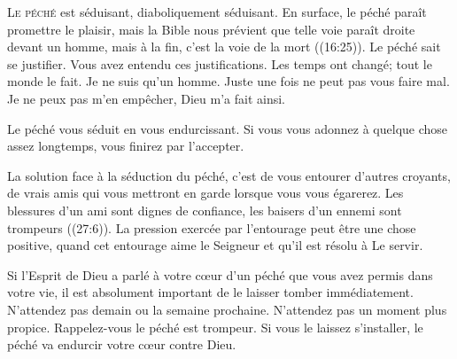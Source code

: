 \dvrule






\lettrine{L}{e péché} est séduisant, diaboliquement séduisant.
 En surface, le péché paraît promettre le plaisir,
 mais la Bible nous prévient que \Og telle 
 voie paraît droite devant un homme, mais à la fin,
 c'est la voie de la mort \Fg{} ((16:25)).
 Le péché sait se justifier. Vous avez entendu ces justifications.
 \Og Les temps ont changé; tout le monde le fait. \Fg{}
 \Og Je ne suis qu'un homme. \Fg{}
 \Og Juste une fois ne peut pas vous faire mal. \Fg{}
 \Og Je ne peux pas m'en empêcher, Dieu m'a fait ainsi. \Fg{}


Le péché vous séduit en vous endurcissant.
 Si vous vous adonnez à quelque chose assez longtemps,
 vous finirez par l'accepter. 

La solution face à la séduction du péché, c'est de vous entourer
 d'autres croyants, de vrais amis qui vous mettront en garde
 lorsque vous vous égarerez.
 \Og Les blessures d'un ami sont dignes de confiance,
 les baisers d'un ennemi sont trompeurs \Fg{} ((27:6)).
 La pression exercée par l'entourage peut être une chose positive,
 quand cet entourage aime le Seigneur et qu'il est résolu à Le servir. 

Si l'Esprit de Dieu a parlé à votre c\oe{}ur d'un péché que vous avez permis
 dans votre vie, il est absolument important de le laisser tomber
 immédiatement.
 N'attendez pas demain ou la semaine prochaine.
 N'attendez pas un moment plus propice. Rappelez-vous\frcolon
 le péché est trompeur.
 Si vous le laissez s'installer,
 le péché va endurcir votre c\oe{}ur contre Dieu. 

\dvrule



